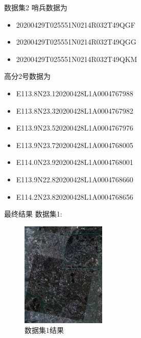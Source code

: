\begin{frame}{数据集2}
    \tiny
    哨兵数据为
    \begin{itemize}
        \item 20200429T025551N0214R032T49QGF
        \item 20200429T025551N0214R032T49QGG
        \item 20200429T025551N0214R032T49QKM
    \end{itemize}
    高分2号数据为
    
    \begin{itemize}
        \item E113.8N23.120200428L1A0004767988
        \item E113.8N23.320200428L1A0004767982
        \item E113.9N23.520200428L1A0004767976
        \item E113.9N23.720200428L1A0004768005
        \item E114.0N23.920200428L1A0004768001
        \item E113.9N22.820200428L1A0004768660
        \item E114.2N23.820200428L1A0004768656
    \end{itemize}
\end{frame}

\begin{frame}{最终结果}
    数据集1:
    \begin{figure}
        \centering
        \includegraphics[height=5cm]{pic/pic0114.jpg}
        \caption{数据集1结果}
        \label{fig:0101}
    \end{figure}
\end{frame}